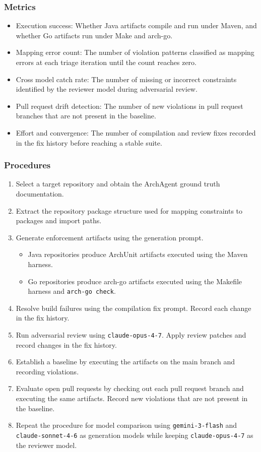 \documentclass[sigconf,screen]{acmart}
\begin{document}
\subsubsection{Metrics}
\begin{itemize}
    \item Execution success: Whether Java artifacts compile and run under Maven, and whether Go artifacts run under Make and arch-go.
    \item Mapping error count: The number of violation patterns classified as mapping errors at each triage iteration until the count reaches zero.
    \item Cross model catch rate: The number of missing or incorrect constraints identified by the reviewer model during adversarial review.
    \item Pull request drift detection: The number of new violations in pull request branches that are not present in the baseline.
    \item Effort and convergence: The number of compilation and review fixes recorded in the fix history before reaching a stable suite.
\end{itemize}

\subsubsection{Procedures}
\begin{enumerate}
    \item Select a target repository and obtain the ArchAgent ground truth documentation.
    \item Extract the repository package structure used for mapping constraints to packages and import paths.
    \item Generate enforcement artifacts using the generation prompt.
    \begin{itemize}
        \item Java repositories produce ArchUnit artifacts executed using the Maven harness.
        \item Go repositories produce arch-go artifacts executed using the Makefile harness and \texttt{arch-go check}.
    \end{itemize}
    \item Resolve build failures using the compilation fix prompt. Record each change in the fix history.
    \item Run adversarial review using \texttt{claude-opus-4-7}. Apply review patches and record changes in the fix history.
    \item Establish a baseline by executing the artifacts on the main branch and recording violations.
    \item Evaluate open pull requests by checking out each pull request branch and executing the same artifacts. Record new violations that are not present in the baseline.
    \item Repeat the procedure for model comparison using \texttt{gemini-3-flash} and \texttt{claude-sonnet-4-6} as generation models while keeping \texttt{claude-opus-4-7} as the reviewer model.
\end{enumerate}
\end{document}
